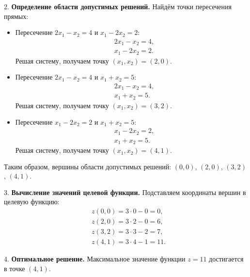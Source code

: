 \documentclass[a4paper,12pt]{article}
\begin{document}
2. \textbf{Определение области допустимых решений.} Найдём точки пересечения прямых:
\begin{itemize}
    \item Пересечение $2x_1 - x_2 = 4$ и $x_1 - 2x_2 = 2$:
    \[
    \begin{aligned}
        &2x_1 - x_2 = 4, \\
        &x_1 - 2x_2 = 2.
    \end{aligned}
    \]
    Решая систему, получаем точку $(x_1, x_2) = (2, 0)$.
    \item Пересечение $2x_1 - x_2 = 4$ и $x_1 + x_2 = 5$:
    \[
    \begin{aligned}
        &2x_1 - x_2 = 4, \\
        &x_1 + x_2 = 5.
    \end{aligned}
    \]
    Решая систему, получаем точку $(x_1, x_2) = (3, 2)$.
    \item Пересечение $x_1 - 2x_2 = 2$ и $x_1 + x_2 = 5$:
    \[
    \begin{aligned}
        &x_1 - 2x_2 = 2, \\
        &x_1 + x_2 = 5.
    \end{aligned}
    \]
    Решая систему, получаем точку $(x_1, x_2) = (4, 1)$.
\end{itemize}
Таким образом, вершины области допустимых решений: $(0, 0)$, $(2, 0)$, $(3, 2)$, $(4, 1)$. 

3. \textbf{Вычисление значений целевой функции.} Подставляем координаты вершин в целевую функцию:
\[
\begin{aligned}
    &z(0, 0) = 3 \cdot 0 - 0 = 0, \\
    &z(2, 0) = 3 \cdot 2 - 0 = 6, \\
    &z(3, 2) = 3 \cdot 3 - 2 = 7, \\
    &z(4, 1) = 3 \cdot 4 - 1 = 11.
\end{aligned}
\]

4. \textbf{Оптимальное решение.} Максимальное значение функции $z = 11$ достигается в точке $(4, 1)$.
\end{document}
